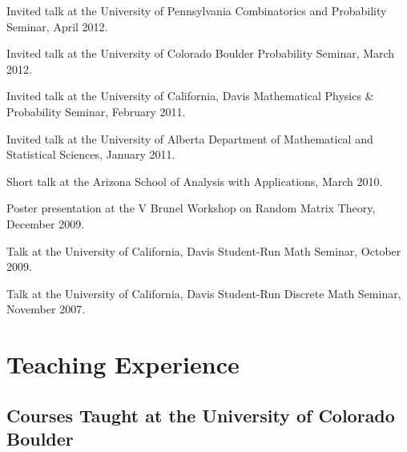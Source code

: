\documentclass[letterpaper]{article}
\renewenvironment{itemize}{
  \begin{list}{}{
    \setlength{\leftmargin}{1em}
  }
}{
  \end{list}
}
\begin{document}
\begin{itemize}
	\item Invited talk at the University of Pennsylvania Combinatorics and Probability Seminar, April 2012.
	\item Invited talk at the University of Colorado Boulder Probability Seminar, March 2012.
	\item Invited talk at the University of California, Davis Mathematical Physics \& Probability Seminar, February 2011.  
	\item Invited talk at the University of Alberta Department of Mathematical and Statistical Sciences, January 2011.  
	\item Short talk at the Arizona School of Analysis with Applications, March 2010.
	\item Poster presentation at the V Brunel Workshop on Random Matrix Theory, December 2009.
	\item Talk at the University of California, Davis Student-Run Math Seminar, October 2009.
	\item Talk at the University of California, Davis Student-Run Discrete Math Seminar, November 2007.
\end{itemize}
 


\section*{Teaching Experience}
\subsection*{Courses Taught at the University of Colorado Boulder}
\end{document}
